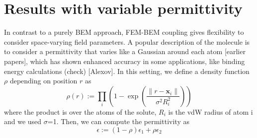 
\section*{\sffamily \Large Results with variable permittivity}

In contrast to a purely BEM approach, FEM-BEM coupling gives flexibility to consider space-varying field parameters. 
A popular description of the molecule is to consider a permittivity that varies like a Gaussian around each atom [earlier papers], which has shown enhanced accuracy in some applications, like binding energy calculations (check) [Alexov].
In this setting, we define a density function $\rho$ depending on position $r$ as
%
\begin{equation}
\rho(r) := \prod_i \left(1 - \exp{\left(\frac{\|r-\mathbf{x}_i\|}{\sigma^2 R_i^2}\right)}\right)
\end{equation}
%
where the product is over the atoms of the solute, $R_i$ is the vdW
radius of atom i and we used $\sigma$=1. Then, we can compute the permittivity as
%
\begin{equation}
\epsilon := \left(1-\rho \right) \epsilon_1 + \rho\epsilon_2
\end{equation}
%

